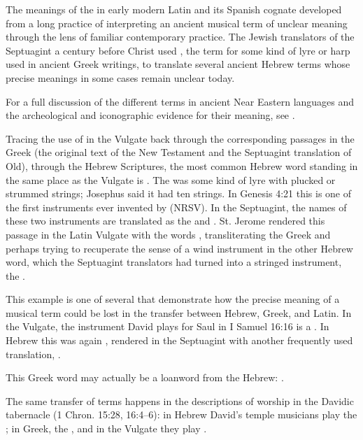 The meanings of the  in early modern Latin and its Spanish
cognate  developed from a long practice of interpreting an ancient
musical term of unclear meaning through the lens of familiar contemporary
practice.
The Jewish translators of the Septuagint a century before Christ used
, the term for some kind of lyre or harp used in ancient Greek
writings, to translate several ancient Hebrew terms whose precise meanings in
some cases remain unclear today.%
\begin{Footnote} 
    For a full discussion of the different terms in ancient Near Eastern
    languages and the archeological and iconographic evidence for their
    meaning, see \autocite{Lawergren:Lyres}.
\end{Footnote}
Tracing the use of  in the Vulgate back through the corresponding
passages in the Greek (the original text of the New Testament and the
Septuagint translation of Old), through the Hebrew Scriptures, the most common
Hebrew word standing in the same place as the Vulgate  is
.
The  was some kind of lyre with plucked or strummed strings;
Josephus said it had ten strings.%
    \Autocite[]{Bromily:BibleEncyclopedia}
In Genesis 4:21 this is one of the first instruments ever invented by
 (NRSV).
In the Septuagint, the names of these two instruments are translated as the
 and .
St. Jerome rendered this passage in the Latin Vulgate with the words
, transliterating the Greek  and
perhaps trying to recuperate the sense of a wind instrument in the other Hebrew
word, which the Septuagint translators had turned into a stringed instrument,
the .

This example is one of several that demonstrate how the precise meaning of a
musical term could be lost in the transfer between Hebrew, Greek, and Latin.
In the Vulgate, the instrument David plays for Saul in I Samuel 16:16 is a
.
In Hebrew this was again , rendered in the Septuagint with another
frequently used translation, .%
\begin{Footnote}
    This Greek word may actually be a loanword from the Hebrew:
    \autocite{Brown:HebrewOTLexicon}.
\end{Footnote}
The same transfer of terms happens in the descriptions of worship in the Davidic
tabernacle (1 Chron. 15:28, 16:4--6): in Hebrew David's temple musicians play
the ; in Greek, the , and in the Vulgate they
play .

